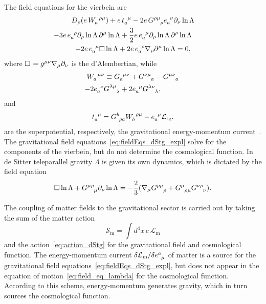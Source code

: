 \documentclass[%
aps,
prd,
reprint
]{revtex4-1}
\newcommand{\ind}{\indices}
\def\pd{\partial}
\def\mc{\mathcal}
\def\mrm{\mathrm}
\begin{document}
The field equations for the vierbein are
\begin{multline}
\label{eq:fieldEqs_dStg_expl}
   D_\rho (e\, W\ind{_a^{\rho\mu}}) + e\, t\ind{_a^\mu} - 2e\, 
   G\ind{^{\rho\mu}_\rho} e\ind{_a^\nu} \pd_\nu \ln \Lambda
   \\
   - 3 e\, e\ind{_a^\rho} \pd_\rho \ln \Lambda\, \pd^\mu \ln 
   \Lambda + \frac{3}{2} e\, e\ind{_a^\mu} \pd_\rho \ln \Lambda\, 
   \pd^\rho \ln \Lambda \hspace{1cm}
   \\
   - 2e\, e\ind{_a^\mu} \Box \ln \Lambda
   +2e\, e\ind{_a^\rho} \nabla_\rho \pd^\mu \ln \Lambda= 0,
\end{multline}
where $\Box\hspace{0.1em} = g^{\mu\nu} \nabla_\mu \pd_\nu$ is the 
d'Alembertian, while
\begin{multline*}
  W\ind{_a^{\mu\nu}} \equiv G\ind{_a^{\mu\nu}} 
  + G\ind{^{\nu\mu}_a} - G\ind{^{\mu\nu}_a} \\
  - 2e\ind{_a^\nu} G\ind{^{\lambda\mu}_\lambda} + 2e\ind{_a^\mu} 
  G\ind{^{\lambda\nu}_\lambda}, \hspace{1cm}
\end{multline*}
and
\begin{equation*}
  t\ind{_a^\mu} = G\ind{^b_{\rho a}} W\ind{_b^{\rho\mu}} 
  - e\ind{_a^\mu} \mathcal{L}_\mrm{tg}.
\end{equation*}
are the superpotential, respectively, the gravitational 
energy-momentum current~\cite{Maluf:2013gaa}. The gravitational 
field equations~\eqref{eq:fieldEqs_dStg_expl} solve for the 
components of the vierbein, but do not determine the cosmological 
function. In de Sitter teleparallel gravity $\Lambda$ is given 
its own dynamics, which is dictated by the field equation
\begin{equation}
\label{eq:field_eq_lambda}
  \Box \ln \Lambda + G\ind{^{\mu\rho}_\mu} \pd_\rho \ln \Lambda =
  -\frac{2}{3} ( \nabla_\mu G\ind{^{\rho\mu}_\rho} 
  + G\ind{^\mu_{\rho\mu}} G\ind{^{\nu\rho}_\nu} ).
\end{equation}

The coupling of matter fields to the gravitational sector is 
carried out by taking the sum of the matter action
\begin{equation*}
  \mc{S}_\mrm{m} = \int d^4x \, e \, \mc{L}_\mrm{m}
\end{equation*}
and the action~\eqref{eq:action_dStg} for the gravitational field 
and cosmological function. The energy-momentum current $\delta 
\mc{L}_\mrm{m}/\delta e\ind{^a_\mu}$ of matter is a source for 
the gravitational field equations~\eqref{eq:fieldEqs_dStg_expl}, 
but does not appear in the equation of 
motion~\eqref{eq:field_eq_lambda} for the cosmological function.  
According to this scheme, energy-momentum generates gravity, 
which in turn sources the cosmological function.
\end{document}
